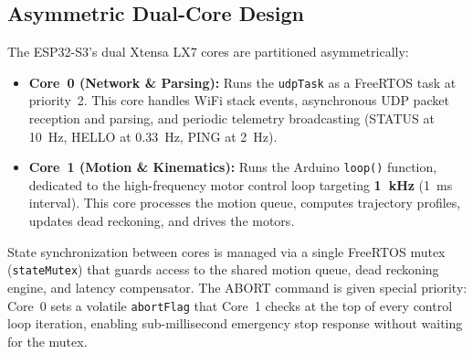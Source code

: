 \documentclass[12pt, a4paper, twoside]{article}
\begin{document}
\subsection{Asymmetric Dual-Core Design}

The ESP32-S3's dual Xtensa LX7 cores are partitioned asymmetrically:

\begin{itemize}
    \item \textbf{Core~0 (Network \& Parsing):} Runs the \texttt{udpTask} as a FreeRTOS task at priority~2. This core handles WiFi stack events, asynchronous UDP packet reception and parsing, and periodic telemetry broadcasting (STATUS at \SI{10}{\hertz}, HELLO at \SI{0.33}{\hertz}, PING at \SI{2}{\hertz}).

    \item \textbf{Core~1 (Motion \& Kinematics):} Runs the Arduino \texttt{loop()} function, dedicated to the high-frequency motor control loop targeting \textbf{\SI{1}{\kilo\hertz}} (\SI{1}{\milli\second} interval). This core processes the motion queue, computes trajectory profiles, updates dead reckoning, and drives the motors.
\end{itemize}

State synchronization between cores is managed via a single FreeRTOS mutex (\texttt{stateMutex}) that guards access to the shared motion queue, dead reckoning engine, and latency compensator. The ABORT command is given special priority: Core~0 sets a volatile \texttt{abortFlag} that Core~1 checks at the top of every control loop iteration, enabling sub-millisecond emergency stop response without waiting for the mutex.
\end{document}
